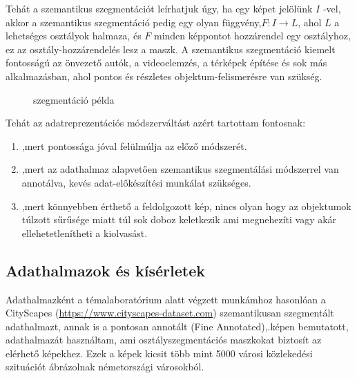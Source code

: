 \documentclass[12pt,oneside,a4paper]{article}
\theoremstyle{remark}
\begin{document}
Tehát a szemantikus szegmentációt leírhatjuk úgy, ha egy képet jelölünk \(I\) -vel, akkor a szemantikus
szegmentáció pedig egy olyan függvény,\(F: I \rightarrow L\), ahol \(L\) a lehetséges osztályok halmaza, és \(F\) minden
képpontot hozzárendel egy osztályhoz, ez az osztály-hozzárendelés lesz a maszk.
A szemantikus szegmentáció kiemelt fontosságú az önvezető autók, a
videoelemzés, a térképek építése és sok más
alkalmazásban, ahol pontos és részletes objektum-felismerésre van szükség.
\begin{figure}[ht]
    \centering
    \caption{szegmentáció példa}\label{fig:szegmentation example}
\end{figure}
Tehát az adatreprezentációs módszerváltást azért tartottam fontosnak:
\begin{enumerate}
    \item ,mert pontossága jóval felülmúlja az előző módszerét.
    \item ,mert az adathalmaz alapvetően szemantikus szegmentálási módszerrel van annotálva,
            kevés adat-előkészítési munkálat  szükséges.
    \item ,mert könnyebben érthető a feldolgozott kép, nincs olyan hogy az objektumok túlzott sűrűsége miatt túl sok
           doboz keletkezik ami megnehezíti vagy akár ellehetetlenítheti a kiolvasást.
\end{enumerate}


\subsection{Adathalmazok és kísérletek}\label{subsec:adathalmazok-es-kiserletek}
    Adathalmazként a témalaboratórium alatt végzett munkámhoz hasonlóan a CityScapes
    (\url{https://www.cityscapes-dataset.com}) szemantikusan szegmentált adathalmazt, annak is a pontosan annotált
    (Fine Annotated),\label{kephivatkozas}.képen bemutatott,
    adathalmazát használtam, ami osztályszegmentációs maszkokat biztosít az elérhető képekhez.
    Ezek a képek kicsit több mint 5000 városi közlekedési szituációt ábrázolnak
    németországi városokból.
\end{document}
